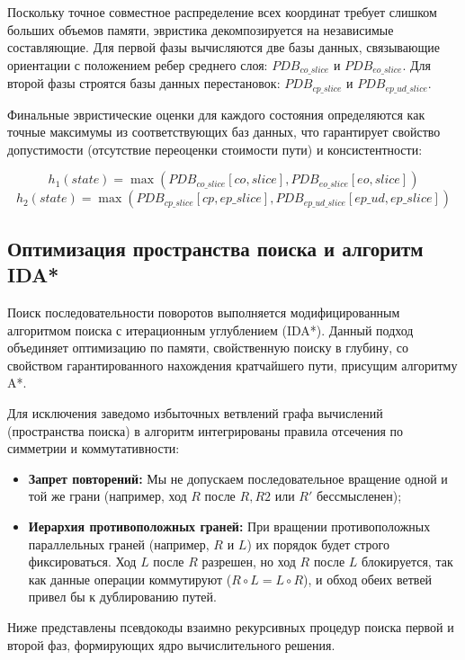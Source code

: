 \documentclass{article}
\begin{document}
Поскольку точное совместное распределение всех координат требует слишком больших объемов памяти, эвристика декомпозируется на независимые составляющие. Для первой фазы вычисляются две базы данных, связывающие ориентации с положением ребер среднего слоя: $PDB_{co\_slice}$ и $PDB_{eo\_slice}$. Для второй фазы строятся базы данных перестановок: $PDB_{cp\_slice}$ и $PDB_{ep\_ud\_slice}$.

Финальные эвристические оценки для каждого состояния определяются как точные максимумы из соответствующих баз данных, что гарантирует свойство допустимости (отсутствие переоценки стоимости пути) и консистентности:

\begin{equation}
h_1(state) = \max\left(PDB_{co\_slice}[co, slice], PDB_{eo\_slice}[eo, slice]\right)
\end{equation}
\begin{equation}
h_2(state) = \max\left(PDB_{cp\_slice}[cp, ep\_slice], PDB_{ep\_ud\_slice}[ep\_ud, ep\_slice]\right)
\end{equation}

\subsection{Оптимизация пространства поиска и алгоритм IDA*}
Поиск последовательности поворотов выполняется модифицированным алгоритмом поиска с итерационным углублением (IDA*). Данный подход объединяет оптимизацию по памяти, свойственную поиску в глубину, со свойством гарантированного нахождения кратчайшего пути, присущим алгоритму A*.

Для исключения заведомо избыточных ветвлений графа вычислений (пространства поиска) в алгоритм интегрированы правила отсечения по симметрии и коммутативности{}:
\begin{itemize}
\item \textbf{Запрет повторений:} Мы не допускаем последовательное вращение одной и той же грани (например, ход $R$ после $R, R2$ или $R'$ бессмысленен);
\item \textbf{Иерархия противоположных граней:} При вращении противоположных параллельных граней (например, $R$ и $L$) их порядок будет строго фиксироваться. Ход $L$ после $R$ разрешен, но ход $R$ после $L$ блокируется, так как данные операции коммутируют ($R \circ L = L \circ R$), и обход обеих ветвей привел бы к дублированию путей.
\end{itemize}

Ниже представлены псевдокоды взаимно рекурсивных процедур поиска первой и второй фаз, формирующих ядро вычислительного решения.
\end{document}
